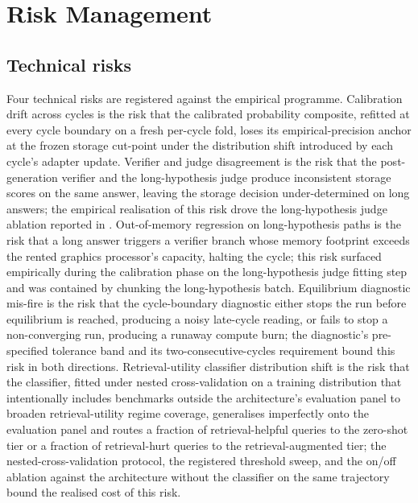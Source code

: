 \section{Risk Management}
\label{sec:risk}

\subsection{Technical risks}
\label{sec:risk-technical}

Four technical risks are registered against the empirical programme. Calibration drift across cycles is the risk that the calibrated probability composite, refitted at every cycle boundary on a fresh per-cycle fold, loses its empirical-precision anchor at the frozen storage cut-point under the distribution shift introduced by each cycle's adapter update. Verifier and judge disagreement is the risk that the post-generation verifier and the long-hypothesis judge produce inconsistent storage scores on the same answer, leaving the storage decision under-determined on long answers; the empirical realisation of this risk drove the long-hypothesis judge ablation reported in . Out-of-memory regression on long-hypothesis paths is the risk that a long answer triggers a verifier branch whose memory footprint exceeds the rented graphics processor's capacity, halting the cycle; this risk surfaced empirically during the calibration phase on the long-hypothesis judge fitting step and was contained by chunking the long-hypothesis batch. Equilibrium diagnostic mis-fire is the risk that the cycle-boundary diagnostic either stops the run before equilibrium is reached, producing a noisy late-cycle reading, or fails to stop a non-converging run, producing a runaway compute burn; the diagnostic's pre-specified tolerance band and its two-consecutive-cycles requirement bound this risk in both directions. Retrieval-utility classifier distribution shift is the risk that the classifier, fitted under nested cross-validation on a training distribution that intentionally includes benchmarks outside the architecture's evaluation panel to broaden retrieval-utility regime coverage, generalises imperfectly onto the evaluation panel and routes a fraction of retrieval-helpful queries to the zero-shot tier or a fraction of retrieval-hurt queries to the retrieval-augmented tier; the nested-cross-validation protocol, the registered threshold sweep, and the on/off ablation against the architecture without the classifier on the same trajectory bound the realised cost of this risk.


